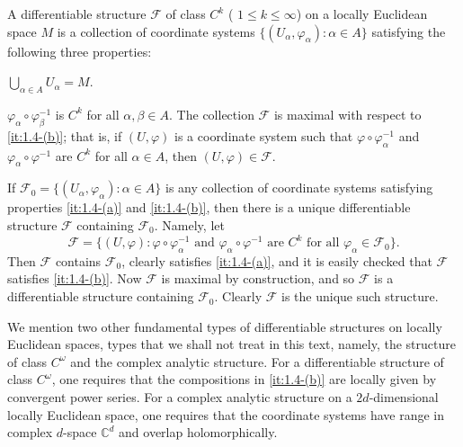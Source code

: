 \begin{definition}\label{thm:1.4}
	A differentiable structure  $ \mathcal{F} $ of class  $ C^k $ ( $ 1 \leq k \leq \infty $) on a
	locally Euclidean space  $ M $ is a collection of coordinate systems
	$\{(U_\alpha,\varphi_\alpha): \alpha \in A\}$ satisfying the following
	three properties: 
	\begin{enumerate}
		 \label{it:1.4-(a)} $ \bigcup_{\alpha\in A}U_\alpha = M $.

		 \label{it:1.4-(b)}  $ \varphi_{\alpha} \circ \varphi_{\beta}^{-1} $ is
		$ C^{k} $ for all  $ \alpha, \beta \in A $.
		 \label{it:1.4-(c)} The collection $\mathcal{F}$ is maximal with respect to \ref{it:1.4-(b)};
		that is, if $(U,\varphi)$ is a coordinate system such that
		$\varphi\circ\varphi_{\alpha}^{-1}$ and $\varphi_{\alpha}\circ\varphi^{-1}$
		are $C^{k}$ for all $\alpha\in A$, then $(U,\varphi)\in\mathcal{F}$.
	\end{enumerate}
\end{definition}
If $\mathcal{F}_{0}=\{(U_{\alpha},\varphi_{\alpha})\colon \alpha\in A\}$ is any collection of coordinate systems satisfying
properties \ref{it:1.4-(a)} and \ref{it:1.4-(b)},
then there is a unique differentiable structure  $ \mathcal{F} $ containing
$ \mathcal{F}_{0} $. Namely, let 
\[
	\mathcal{F}=\{(U,\varphi)\colon\varphi\circ\varphi_{\alpha}^{-1}\text{ and }\varphi_{\alpha}\circ\varphi^{-1}\text{ are }C^{k}\text{ for all }\varphi_{\alpha}\in\mathcal{F}_{0}\}.
\]
Then $\mathcal{F}$ contains $\mathcal{F}_{0}$, clearly satisfies \ref{it:1.4-(a)},
and it is easily checked that $\mathcal{F}$ satisfies \ref{it:1.4-(b)}.
Now $\mathcal{F}$ is maximal by construction, and so $\mathcal{F}$ is a differentiable structure
containing $\mathcal{F}_{0}$. Clearly $\mathcal{F}$ is the unique such structure.

We mention two other fundamental types of differentiable structures on locally Euclidean spaces,
types that we shall not treat in this text, namely, the structure of class $C^{\omega}$ and
the complex analytic structure. For a differentiable structure of class $C^{\omega}$,
one requires that the compositions in \ref{it:1.4-(b)}
are locally given by convergent power series. For a complex analytic structure on a
$2d$-dimensional locally Euclidean space, one requires that the coordinate systems have
range in complex $d$-space $\mathbb{C}^{d}$ and overlap holomorphically.

